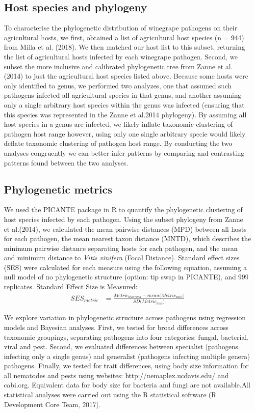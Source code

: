 \documentclass[12pt,letter]{article}
\begin{document}
\subsection{Host species and phylogeny}
To characterise the phylogenetic distribution of winegrape pathogens on their agricultural hosts, we first, obtained a list of agricultural host species (n = 944) from Milla et al. (2018). We then matched our host list to this subset, returning the list of agricultural hosts infected by each winegrape pathogen. Second, we subset the more inclusive and calibrated phylogenetic tree from Zanne et al. (2014\cite{Zanne2014}) to just the agricultural host species listed above. Because some hosts were only identified to genus, we performed two analyzes, one that assumed such pathogens infected all agricultural species in that genus, and another assuming only a single arbitrary host species within the genus was infected (ensuring that this species was represented in the Zanne et al.2014 phylogeny\cite{Zanne2014}). By assuming all host species in a genus are infected, we likely inflate taxonomic clustering of pathogen host range however, using only one single arbitrary specie would likely deflate taxonomic clustering of pathogen host range. By conducting the two analyses congruently we can better infer patterns by comparing and contrasting patterns found between the two analyses.  
\subsection{Phylogenetic metrics}
We used the PICANTE package in R to quantify the phylogenetic clustering of host species infected by each pathogen. Using the subset phylogeny from Zanne et al.(2014\cite{Zanne2014}), we calculated the mean pairwise distances (MPD) between all hosts for each pathogen, the mean nearest taxon distance (MNTD), which describes the minimum pairwise distance separating hosts for each pathogen, and the mean and minimum distance to \textit{Vitis vinifera} (Focal Distance). Standard effect sizes (SES) were calculated for each measure using the following equation, assuming a null model of no phylogenetic structure (option: tip swap in PICANTE), and 999 replicates. 
Standard Effect Size is Measured:  
\begin{align}
SES_{metric} & = \frac{Metric_{observed}-{mean({Metric_{null})}}}{SD({Metric_{null})}}
\end{align}

We explore variation in phylogenetic structure across pathogens using regression models and Bayesian analyses. First, we tested for broad differences across taxonomic groupings, separating pathogens into four categories: fungal, bacterial, viral and pest. Second, we evaluated differences between specialist (pathogens infecting only a single genus) and generalist (pathogens infecting multiple genera) pathogens. Finally, we tested for trait differences, using body size information for all nematodes and pests using websites: http://nemaplex.ucdavis.edu/ and cabi.org. Equivalent data for body size for bacteria and fungi are not available.All statistical analyses were carried out using the R statistical software (R Development Core Team, 2017).
\end{document}
